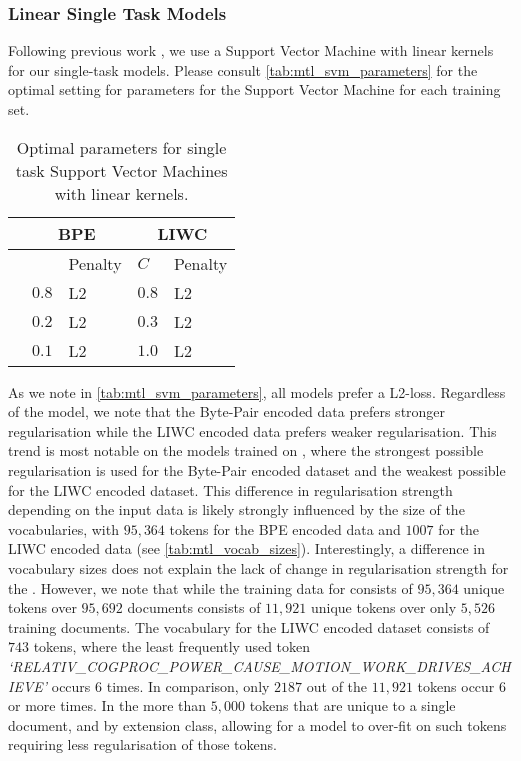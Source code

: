 \subsubsection{Linear Single Task Models}

Following previous work \cite{Waseem:2016,Davidson:2017}, we use a Support Vector Machine with linear kernels for our single-task models. Please consult \autoref{tab:mtl_svm_parameters} for the optimal setting for parameters for the Support Vector Machine for each training set.

\begin{table}[]
\centering
\begin{tabular}{l|ll|ll}
                     & \multicolumn{2}{c}{BPE} & \multicolumn{2}{c}{LIWC} \\ \hline
                     &         & Penalty       & $C$      & Penalty       \\ \hline
\cite{Waseem:2016}   & $0.8$   & L2            & $0.8$    & L2            \\
\cite{Davidson:2017} & $0.2$   & L2            & $0.3$    & L2            \\
\cite{Wulczyn:2017}  & $0.1$   & L2            & $1.0$    & L2
\end{tabular}
\caption{Optimal parameters for single task Support Vector Machines with linear kernels.}
\label{tab:mtl_svm_parameters}
\end{table}

As we note in \autoref{tab:mtl_svm_parameters}, all models prefer a L2-loss. Regardless of the model, we note that the Byte-Pair encoded data prefers stronger regularisation while the LIWC encoded data prefers weaker regularisation. This trend is most notable on the models trained on \citet{Wulczyn:2017}, where the strongest possible regularisation is used for the Byte-Pair encoded dataset and the weakest possible for the LIWC encoded dataset. This difference in regularisation strength depending on the input data is likely strongly influenced by the size of the vocabularies, with $95,364$ tokens for the BPE encoded data and $1007$ for the LIWC encoded data (see \autoref{tab:mtl_vocab_sizes}). Interestingly, a difference in vocabulary sizes does not explain the lack of change in regularisation strength for the \citet{Waseem:2016}. However, we note that while the training data for \citet{Wulczyn:2017} consists of $95,364$ unique tokens over $95,692$ documents \citet{Waseem:2016} consists of $11,921$ unique tokens over only $5,526$ training documents. The vocabulary for the LIWC encoded \citet{Waseem:2016} dataset consists of $743$ tokens, where the least frequently used token \textit{`RELATIV\_COGPROC\_POWER\_CAUSE\_MOTION\_WORK\_DRIVES\_ACHIEVE'} occurs $6$ times. In comparison, only $2187$ out of the $11,921$ tokens occur $6$ or more times. In the more than $5,000$ tokens that are unique to a single document, and by extension class, allowing for a model to over-fit on such tokens requiring less regularisation of those tokens.

